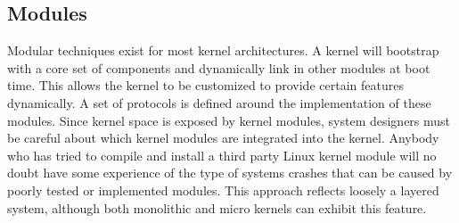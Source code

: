 \documentclass[10pt,a4paper]{article}
\begin{document}
\subsection{Modules}
Modular techniques exist for most kernel architectures. A kernel will bootstrap with a core set of components and dynamically link in other modules at boot time. This allows the kernel to be customized to provide certain features dynamically. A set of protocols is defined around the implementation of these modules. Since kernel space is exposed by kernel modules, system designers must be careful about which kernel modules are integrated into the kernel. Anybody who has tried to compile and install a third party Linux kernel module will no doubt have some experience of the type of systems crashes that can be caused by poorly tested or implemented modules. This approach reflects loosely a layered system, although both monolithic and micro kernels can exhibit this feature. 
\end{document}
